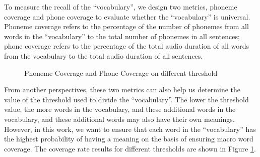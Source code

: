 To measure the recall of the ``vocabulary'', we design two metrics, phoneme coverage and phone coverage to evaluate whether the ``vocabulary'' is universal. Phoneme coverage refers to the percentage of the number of phonemes from all words in the ``vocabulary'' to the total number of phonemes in all sentences; phone coverage refers to the percentage of the total audio duration of all words from the vocabulary to the total audio duration of all sentences.%

\begin{figure}[th]
    \centering
    \caption{Phoneme Coverage and Phone Coverage on different threshold}
    \label{fig:wdc}
\end{figure}

From another perspectives, these two metrics can also help us determine the value of the threshold used to divide the ``vocabulary''. The lower the threshold value, the more words in the vocabulary, and these additional words in the vocabulary, and these additional words may also have their own meanings. However, in this work, we want to ensure that each word in the ``vocabulary'' has the highest probability of having a meaning on the basis of ensuring macro word coverage. The coverage rate results for different thresholds are shown in Figure \ref{fig:wdc}.

